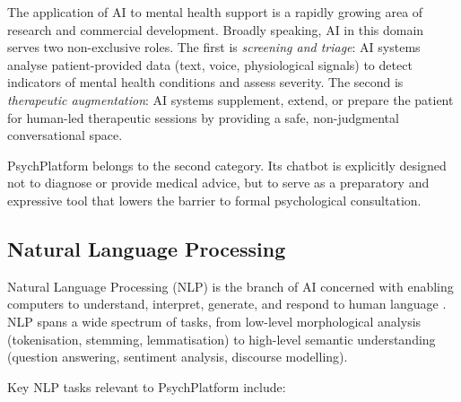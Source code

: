 The application of AI to mental health support is a rapidly growing area of
research and commercial development. Broadly speaking, AI in this domain serves
two non-exclusive roles. The first is \emph{screening and triage}: AI systems
analyse patient-provided data (text, voice, physiological signals) to detect
indicators of mental health conditions and assess severity. The second is
\emph{therapeutic augmentation}: AI systems supplement, extend, or prepare the
patient for human-led therapeutic sessions by providing a safe, non-judgmental
conversational space.

PsychPlatform belongs to the second category. Its chatbot is explicitly designed
not to diagnose or provide medical advice, but to serve as a preparatory and
expressive tool that lowers the barrier to formal psychological consultation.

\subsection{Natural Language Processing}
\label{subsec:nlp}

Natural Language Processing (NLP) is the branch of AI concerned with enabling
computers to understand, interpret, generate, and respond to human language
\cite{JurafskyMartin2023}. NLP spans a wide spectrum of tasks, from low-level
morphological analysis (tokenisation, stemming, lemmatisation) to high-level
semantic understanding (question answering, sentiment analysis, discourse
modelling).

Key NLP tasks relevant to PsychPlatform include:


